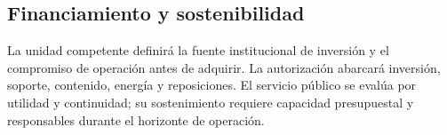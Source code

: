 \subsection{Financiamiento y sostenibilidad}
La unidad competente definirá la fuente institucional de inversión y el compromiso de operación antes de adquirir. La autorización abarcará inversión, soporte, contenido, energía y reposiciones. El servicio público se evalúa por utilidad y continuidad; su sostenimiento requiere capacidad presupuestal y responsables durante el horizonte de operación.
